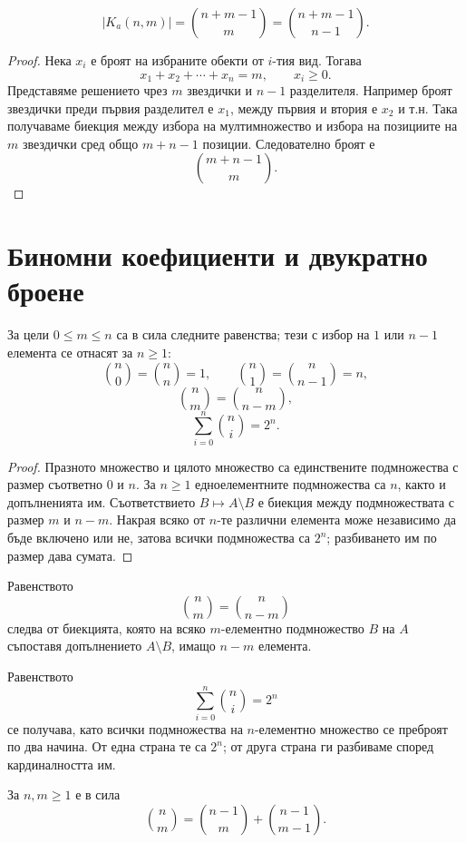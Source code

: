 \begin{thm}
\[
|K_a(n,m)|
=
\binom{n+m-1}{m}
=
\binom{n+m-1}{n-1}.
\]
\end{thm}

\begin{proof}
Нека $x_i$ е броят на избраните обекти от $i$-тия вид. Тогава
\[
x_1+x_2+\cdots+x_n=m,
\qquad x_i\geq 0.
\]
Представяме решението чрез $m$ звездички и $n-1$ разделителя. Например броят звездички преди първия разделител е $x_1$, между първия и втория е $x_2$ и т.н. Така получаваме биекция между избора на мултимножество и избора на позициите на $m$ звездички сред общо $m+n-1$ позиции. Следователно броят е
\[
\binom{m+n-1}{m}.
\]
\end{proof}

\section{Биномни коефициенти и двукратно броене}\label{s:2.3}

\begin{prop}
За цели $0\leq m\leq n$ са в сила следните равенства; тези с избор на $1$ или $n-1$ елемента се отнасят за $n\ge1$:
\[
\binom{n}{0}=\binom{n}{n}=1,
\qquad
\binom{n}{1}=\binom{n}{n-1}=n,
\]
\[
\binom{n}{m}=\binom{n}{n-m},
\]
\[
\sum_{i=0}^{n}\binom{n}{i}=2^n.
\]
\end{prop}

\begin{proof}
Празното множество и цялото множество са единствените подмножества с размер съответно $0$ и $n$. За $n\ge1$ едноелементните подмножества са $n$, както и допълненията им. Съответствието $B\mapsto A\setminus B$ е биекция между подмножествата с размер $m$ и $n-m$. Накрая всяко от $n$-те различни елемента може независимо да бъде включено или не, затова всички подмножества са $2^n$; разбиването им по размер дава сумата.
\end{proof}

Равенството
\[
\binom{n}{m}=\binom{n}{n-m}
\]
следва от биекцията, която на всяко $m$-елементно подмножество $B$ на $A$ съпоставя допълнението $A\setminus B$, имащо $n-m$ елемента.

Равенството
\[
\sum_{i=0}^{n}\binom{n}{i}=2^n
\]
се получава, като всички подмножества на $n$-елементно множество се преброят по два начина. От една страна те са $2^n$; от друга страна ги разбиваме според кардиналността им.

\begin{keythm}
За $n,m\geq 1$ е в сила
\[
\binom{n}{m}
=
\binom{n-1}{m}
+
\binom{n-1}{m-1}.
\]
\end{keythm}


